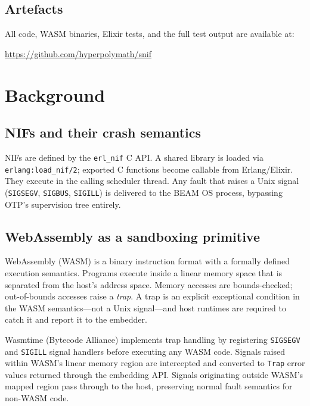 \documentclass[11pt,a4paper]{article}
\begin{document}
\subsection{Artefacts}

All code, WASM binaries, Elixir tests, and the full test output are available
at:
\begin{center}
  \url{https://github.com/hyperpolymath/snif}
\end{center}

\section{Background}
\label{sec:background}

\subsection{NIFs and their crash semantics}

NIFs are defined by the \texttt{erl\_nif} C API. A shared library is loaded
via \texttt{erlang:load\_nif/2}; exported C functions become callable from
Erlang/Elixir. They execute in the calling scheduler thread. Any fault that
raises a Unix signal (\texttt{SIGSEGV}, \texttt{SIGBUS}, \texttt{SIGILL})
is delivered to the BEAM OS process, bypassing OTP's supervision tree entirely.

\subsection{WebAssembly as a sandboxing primitive}

WebAssembly (WASM) is a binary instruction format with a formally defined
execution semantics. Programs execute inside a linear memory space that is
separated from the host's address space. Memory accesses are bounds-checked;
out-of-bounds accesses raise a \textit{trap}. A trap is an explicit exceptional
condition in the WASM semantics---not a Unix signal---and host runtimes are
required to catch it and report it to the embedder.

Wasmtime (Bytecode Alliance) implements trap handling by registering
\texttt{SIGSEGV} and \texttt{SIGILL} signal handlers before executing any
WASM code. Signals raised within WASM's linear memory region are intercepted
and converted to \texttt{Trap} error values returned through the embedding API.
Signals originating outside WASM's mapped region pass through to the host,
preserving normal fault semantics for non-WASM code.
\end{document}
